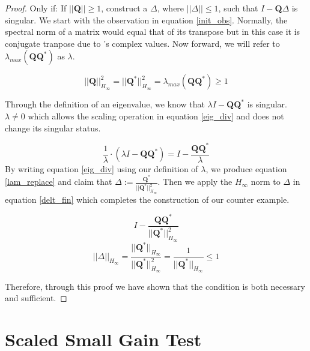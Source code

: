 \documentclass{article}[12pt]
\begin{document}
\begin{proof}
\noindent Only if: If $||\boldsymbol{Q}|| \geq 1$, construct a $\Delta$, where $||\Delta|| \leq 1$, such that $I-\boldsymbol{Q}\Delta$ is singular. We start with the observation in equation \ref{init_obs}. Normally, the spectral norm of a matrix would equal that of its transpose but in this case it is conjugate tranpose due to 's  complex values. Now forward, we will refer to $\lambda_{max}(\boldsymbol{QQ}^*)$ as $\lambda$. 

\begin{equation}
    \label{init_obs}
    || \boldsymbol{Q}||^2_{H_\infty} = || \boldsymbol{Q}^*||^2_{H_\infty} = \lambda_{max}(\boldsymbol{QQ}^*) \geq 1
\end{equation}

\noindent Through the definition of an eigenvalue, we know that $\lambda I - \boldsymbol{QQ}^*$ is singular. $\lambda \neq 0$ which allows the scaling operation in equation \ref{eig_div} and does not change its singular status. 

\begin{equation}
\label{eig_div}
    \frac{1}{\lambda} \cdot (\lambda I - \boldsymbol{QQ}^*) = I - \frac{\boldsymbol{QQ}^*}{\lambda}
\end{equation}
\noindent By writing equation \ref{eig_div} using our definition of $\lambda$, we produce equation \ref{lam_replace} and claim that $\Delta :=\frac{\boldsymbol{Q}^*}{||\boldsymbol{Q}^*||_{H_\infty}^2}$. Then we apply the $H_\infty$ norm to $
\Delta$ in equation \ref{delt_fin} which completes the construction of our counter example.

\begin{equation}
    I - \frac{\boldsymbol{QQ}^*}{||\boldsymbol{Q}^*||^2_{H_\infty}}
    \label{lam_replace}
\end{equation}
\begin{equation}
    \label{delt_fin}
    ||\Delta||_{H_\infty} = \frac{||\boldsymbol{Q}^*||_{H_\infty}}{||\boldsymbol{Q}^*||^2_{H_\infty}} =  \frac{1}{||\boldsymbol{Q}^*||_{H_\infty}} \leq 1
\end{equation}

\noindent Therefore, through this proof we have shown that the condition is both necessary and sufficient. 
\end{proof}









\section{Scaled Small Gain Test}
\end{document}

